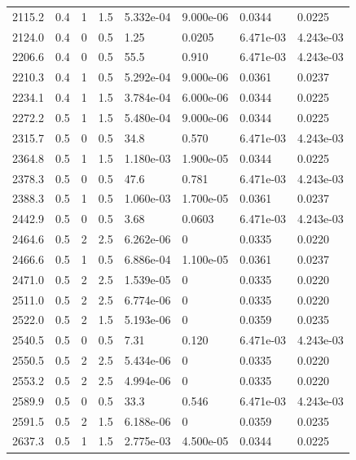 \documentclass[preview]{standalone}
\begin{document}
{{{\begin{tabular}{L{1.2cm}C{1.2cm} C{0.3cm}C{0.5cm} C{1.4cm}C{1.4cm} C{1.4cm}C{1.4cm}}
  2115.2  &   0.4  & 1     & 1.5 &  5.332e-04  & 9.000e-06  & 0.0344 &  0.0225   \\ 
  2124.0  &   0.4  & 0     & 0.5 &  1.25  & 0.0205  & 6.471e-03 &  4.243e-03   \\ 
  2206.6  &   0.4  & 0     & 0.5 &  55.5  & 0.910  & 6.471e-03 &  4.243e-03   \\ 
  2210.3  &   0.4  & 1     & 0.5 &  5.292e-04  & 9.000e-06  & 0.0361 &  0.0237   \\ 
  2234.1  &   0.4  & 1     & 1.5 &  3.784e-04  & 6.000e-06  & 0.0344 &  0.0225   \\ 
  2272.2  &   0.5  & 1     & 1.5 &  5.480e-04  & 9.000e-06  & 0.0344 &  0.0225   \\ 
  2315.7  &   0.5  & 0     & 0.5 &  34.8  & 0.570  & 6.471e-03 &  4.243e-03   \\ 
  2364.8  &   0.5  & 1     & 1.5 &  1.180e-03  & 1.900e-05  & 0.0344 &  0.0225   \\ 
  2378.3  &   0.5  & 0     & 0.5 &  47.6  & 0.781  & 6.471e-03 &  4.243e-03   \\ 
  2388.3  &   0.5  & 1     & 0.5 &  1.060e-03  & 1.700e-05  & 0.0361 &  0.0237   \\ 
  2442.9  &   0.5  & 0     & 0.5 &  3.68  & 0.0603  & 6.471e-03 &  4.243e-03   \\ 
  2464.6  &   0.5  & 2     & 2.5 &  6.262e-06  & 0  & 0.0335 &  0.0220   \\ 
  2466.6  &   0.5  & 1     & 0.5 &  6.886e-04  & 1.100e-05  & 0.0361 &  0.0237   \\ 
  2471.0  &   0.5  & 2     & 2.5 &  1.539e-05  & 0  & 0.0335 &  0.0220   \\ 
  2511.0  &   0.5  & 2     & 2.5 &  6.774e-06  & 0  & 0.0335 &  0.0220   \\ 
  2522.0  &   0.5  & 2     & 1.5 &  5.193e-06  & 0  & 0.0359 &  0.0235   \\ 
  2540.5  &   0.5  & 0     & 0.5 &  7.31  & 0.120  & 6.471e-03 &  4.243e-03   \\ 
  2550.5  &   0.5  & 2     & 2.5 &  5.434e-06  & 0  & 0.0335 &  0.0220   \\ 
  2553.2  &   0.5  & 2     & 2.5 &  4.994e-06  & 0  & 0.0335 &  0.0220   \\ 
  2589.9  &   0.5  & 0     & 0.5 &  33.3  & 0.546  & 6.471e-03 &  4.243e-03   \\ 
  2591.5  &   0.5  & 2     & 1.5 &  6.188e-06  & 0  & 0.0359 &  0.0235   \\ 
  2637.3  &   0.5  & 1     & 1.5 &  2.775e-03  & 4.500e-05  & 0.0344 &  0.0225   \\ 

\end{tabular}}}}
\end{document}

